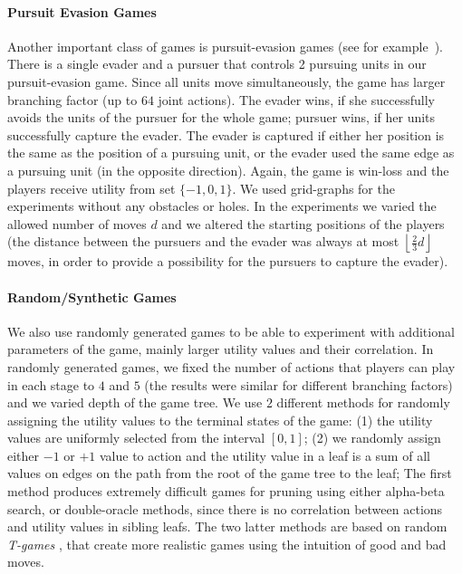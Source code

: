 \paragraph{\textbf{Pursuit Evasion Games}}
Another important class of games is pursuit-evasion games (see for example~\cite{nguyen2013monte}).
There is a single evader and a pursuer that controls 2 pursuing units in our pursuit-evasion game. 
Since all units move simultaneously, the game has larger branching factor (up to $64$ joint actions).
The evader wins, if she successfully avoids the units of the pursuer for the whole game; pursuer wins, if her units successfully capture the evader. The evader is captured if either her position is the same as the position of a pursuing unit, or the evader used the same edge as a pursuing unit (in the opposite direction). 
Again, the game is win-loss and the players receive utility from set $\lbrace -1, 0, 1 \rbrace$.
We used grid-graphs for the experiments without any obstacles or holes.
In the experiments we varied the allowed number of moves $d$ and we altered the starting positions of the players (the distance between the pursuers and the evader was always at most $\left\lfloor\frac{2}{3} d\right\rfloor$ moves, in order to provide a possibility for the pursuers to capture the evader).


\paragraph{\textbf{Random/Synthetic Games}}
We also use randomly generated games to be able to experiment with additional parameters of the game, mainly larger utility values and their correlation.
In randomly generated games, we fixed the number of actions that players can play in each stage to $4$ and $5$ (the results were similar for different branching factors) and we varied depth of the game tree. 
We use $2$ different methods for randomly assigning the utility values to the terminal states of the game: 
(1) the utility values are uniformly selected from the interval $\left[0,1\right]$; 
(2) we randomly assign either $-1$ or $+1$ value to action and the utility value in a leaf is a sum of all values on edges on the path from the root of the game tree to the leaf; 
The first method produces extremely difficult games for pruning using either alpha-beta search, or double-oracle methods, since there is no correlation between actions and utility values in sibling leafs. 
The two latter methods are based on random \emph{T-games} \cite{smith1995}, that create more realistic games using the intuition of good and bad moves.


